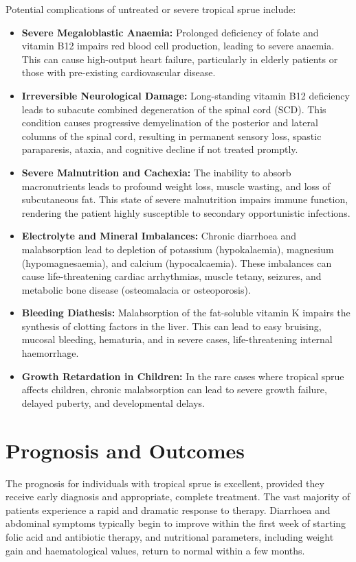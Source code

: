 Potential complications of untreated or severe tropical sprue include:
\begin{itemize}
    \item \textbf{Severe Megaloblastic Anaemia:} Prolonged deficiency of folate and vitamin B12 impairs red blood cell production, leading to severe anaemia. This can cause high-output heart failure, particularly in elderly patients or those with pre-existing cardiovascular disease.
    \item \textbf{Irreversible Neurological Damage:} Long-standing vitamin B12 deficiency leads to subacute combined degeneration of the spinal cord (SCD). This condition causes progressive demyelination of the posterior and lateral columns of the spinal cord, resulting in permanent sensory loss, spastic paraparesis, ataxia, and cognitive decline if not treated promptly.
    \item \textbf{Severe Malnutrition and Cachexia:} The inability to absorb macronutrients leads to profound weight loss, muscle wasting, and loss of subcutaneous fat. This state of severe malnutrition impairs immune function, rendering the patient highly susceptible to secondary opportunistic infections.
    \item \textbf{Electrolyte and Mineral Imbalances:} Chronic diarrhoea and malabsorption lead to depletion of potassium (hypokalaemia), magnesium (hypomagnesaemia), and calcium (hypocalcaemia). These imbalances can cause life-threatening cardiac arrhythmias, muscle tetany, seizures, and metabolic bone disease (osteomalacia or osteoporosis).
    \item \textbf{Bleeding Diathesis:} Malabsorption of the fat-soluble vitamin K impairs the synthesis of clotting factors in the liver. This can lead to easy bruising, mucosal bleeding, hematuria, and in severe cases, life-threatening internal haemorrhage.
    \item \textbf{Growth Retardation in Children:} In the rare cases where tropical sprue affects children, chronic malabsorption can lead to severe growth failure, delayed puberty, and developmental delays.
\end{itemize}

\section*{Prognosis and Outcomes}
The prognosis for individuals with tropical sprue is excellent, provided they receive early diagnosis and appropriate, complete treatment. The vast majority of patients experience a rapid and dramatic response to therapy. Diarrhoea and abdominal symptoms typically begin to improve within the first week of starting folic acid and antibiotic therapy, and nutritional parameters, including weight gain and haematological values, return to normal within a few months.

